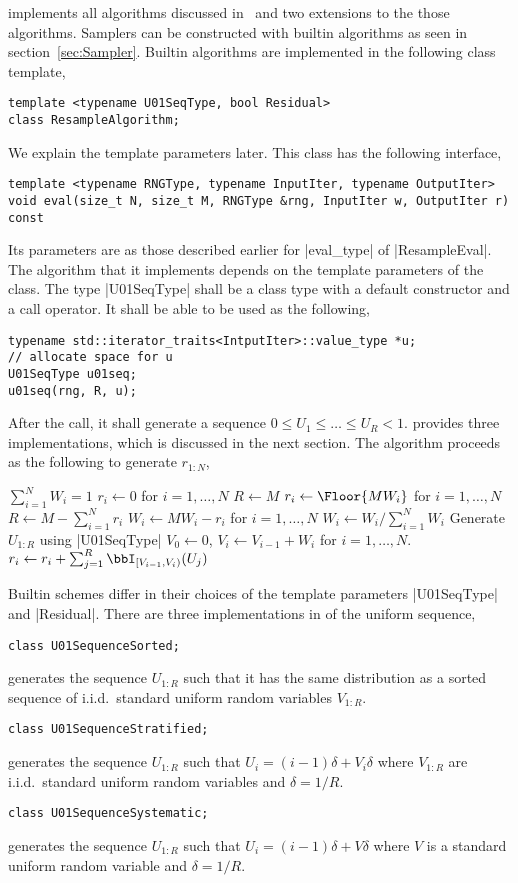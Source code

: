 \mckl implements all algorithms discussed in~\cite{Douc:2005wa} and two
extensions to the those algorithms. Samplers can be constructed with builtin
algorithms as seen in section~\ref{sec:Sampler}. Builtin algorithms are
implemented in the following class template,
\begin{verbatim}
template <typename U01SeqType, bool Residual>
class ResampleAlgorithm;
\end{verbatim}
We explain the template parameters later. This class has the following
interface,
\begin{verbatim}
template <typename RNGType, typename InputIter, typename OutputIter>
void eval(size_t N, size_t M, RNGType &rng, InputIter w, OutputIter r) const
\end{verbatim}
Its parameters are as those described earlier for |eval_type| of
|ResampleEval|. The algorithm that it implements depends on the template
parameters of the class. The type |U01SeqType| shall be a class type with a
default constructor and a call operator. It shall be able to be used as the
following,
\begin{verbatim}
typename std::iterator_traits<IntputIter>::value_type *u;
// allocate space for u
U01SeqType u01seq;
u01seq(rng, R, u);
\end{verbatim}
After the call, it shall generate a sequence $0 \le U_1 \le \dots\le U_R < 1$.
\mckl provides three implementations, which is discussed in the next section.
The algorithm proceeds as the following to generate $r_{1:N}$,
\halfskip
\begin{algorithmic}
  \REQUIRE $\sum_{i=1}^N W_i = 1$
  \STATE $r_i \leftarrow 0$ for $i = 1,\dots,N$
  \STATE $R \leftarrow M$
  \ELSE
  \STATE $r_i \leftarrow \Floor{MW_i}$ for $i = 1,\dots,N$
  \STATE $R \leftarrow M - \sum_{i=1}^N r_i$
  \STATE $W_i \leftarrow MW_i - r_i$ for $i = 1,\dots,N$
  \STATE $W_i \leftarrow W_i / \sum_{i=1}^NW_i$
  \ENDIF
  \STATE Generate $U_{1:R}$ using |U01SeqType|
  \STATE $V_0 \leftarrow 0$, $V_i \leftarrow V_{i - 1} + W_i$ for $i =
  1,\dots,N$.
  \STATE $r_i \leftarrow r_i + \sum_{j=1}^R\bbI_{[V_{i-1},V_i)}(U_j)$
\end{algorithmic}
\halfskip
Builtin schemes differ in their choices of the template parameters |U01SeqType|
and |Residual|. There are three implementations in \mckl of the uniform
sequence,
\begin{verbatim}
class U01SequenceSorted;
\end{verbatim}
generates the sequence $U_{1:R}$ such that it has the same distribution as a
sorted sequence of i.i.d.\ standard uniform random variables $V_{1:R}$.
\begin{verbatim}
class U01SequenceStratified;
\end{verbatim}
generates the sequence $U_{1:R}$ such that $U_i = (i - 1)\delta + V_i\delta$
where $V_{1:R}$ are i.i.d.\ standard uniform random variables and $\delta = 1 /
R$.
\begin{verbatim}
class U01SequenceSystematic;
\end{verbatim}
generates the sequence $U_{1:R}$ such that $U_i = (i - 1)\delta + V\delta$
where $V$ is a standard uniform random variable and $\delta = 1 / R$.

